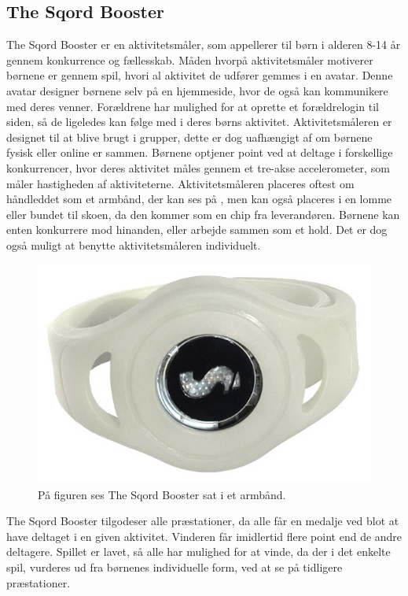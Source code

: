 \subsection{The Sqord Booster}
The Sqord Booster er en aktivitetsmåler, som appellerer til børn i alderen 8-14 år gennem konkurrence og fællesskab. Måden hvorpå aktivitetsmåler motiverer børnene er gennem spil, hvori al aktivitet de udfører gemmes i en avatar. Denne avatar designer børnene selv på en hjemmeside, hvor de også kan kommunikere med deres venner. Forældrene har mulighed for at oprette et forældrelogin til siden, så de ligeledes kan følge med i deres børns aktivitet. Aktivitetsmåleren er designet til at blive brugt i grupper, dette er dog uafhængigt af om børnene fysisk eller online er sammen. \citep{Sqord_family2015} \newline
Børnene optjener point ved at deltage i forskellige konkurrencer, hvor deres aktivitet måles gennem et tre-akse accelerometer, som måler hastigheden af aktiviteterne. Aktivitetsmåleren placeres oftest om håndleddet som et armbånd, der kan ses på , men kan også placeres i en lomme eller bundet til skoen, da den kommer som en chip fra leverandøren. \citep{Sqord_family2015} \newline Børnene kan enten konkurrere mod hinanden, eller arbejde sammen som et hold. Det er dog også muligt at benytte aktivitetsmåleren individuelt. \citep{Sqord_family2015,Sqord_group2015}
\begin{figure}[H]
	\centering
	\includegraphics[scale=0.35]{figures/aProblemanalyse/sqord.JPG}
	\caption{På figuren ses The Sqord Booster sat i et armbånd. \citep{Sqord2016}}
	\label{fig:sqord}
\end{figure}
The Sqord Booster tilgodeser alle præstationer, da alle får en medalje ved blot at have deltaget i en given aktivitet. Vinderen får imidlertid flere point end de andre deltagere. Spillet er lavet, så alle har mulighed for at vinde, da der i det enkelte spil, vurderes ud fra børnenes individuelle form, ved at se på tidligere præstationer. \citep{Sqord_family2015}

